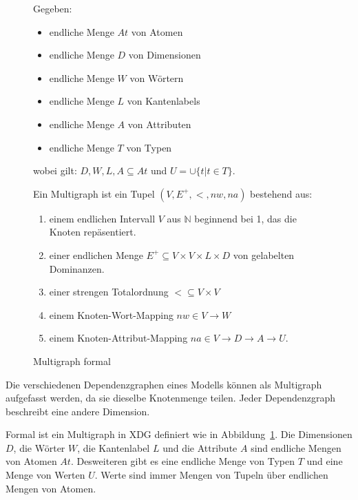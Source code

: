 \begin{figure}
Gegeben:
\begin{itemize}
\item endliche Menge $\mathit{At}$ von Atomen
\item endliche Menge $D$ von Dimensionen
\item endliche Menge $W$ von W\"ortern
\item endliche Menge $L$ von Kantenlabels
\item endliche Menge $A$ von Attributen
\item endliche Menge $T$ von Typen
\end{itemize}
wobei gilt: $D, W, L, A \subseteq \mathit{At}$ und $U = \cup
             \{t|t \in T\}$.

Ein Multigraph ist ein Tupel $(V, E^+, <, \mathit{nw}, \mathit{na})$ bestehend aus:
             \begin{enumerate}
               \item einem endlichen Intervall $V$ aus $\mathbb{N}$ beginnend bei 1, das die
               Knoten rep\"asentiert.
               \item einer endlichen Menge $E^+ \subseteq V \times V \times L \times D$ von gelabelten Dominanzen.
               \item einer strengen Totalordnung $< \subseteq V \times V$
               \item einem Knoten-Wort-Mapping $\mathit{nw} \in V \rightarrow W$

               \item einem Knoten-Attribut-Mapping $\mathit{na} \in V \rightarrow D \rightarrow
               A \rightarrow U$.
             \end{enumerate}
             
\caption{Multigraph formal}
\label{multiformal}
\end{figure}

Die verschiedenen Dependenzgraphen eines Modells k\"onnen als
Multigraph aufgefasst werden, da sie dieselbe Knotenmenge
teilen. Jeder Dependenzgraph beschreibt eine andere Dimension.

Formal ist ein Multigraph in XDG definiert wie in
Abbildung~\ref{multiformal}. Die Dimensionen $D$, die W\"orter $W$, die
Kantenlabel $L$ und die Attribute $A$ sind endliche Mengen von Atomen $\mathit{At}$.
Desweiteren gibt es eine endliche Menge von Typen $T$ und eine Menge von
Werten $U$. Werte sind immer Mengen von Tupeln \"uber endlichen Mengen
von Atomen.


